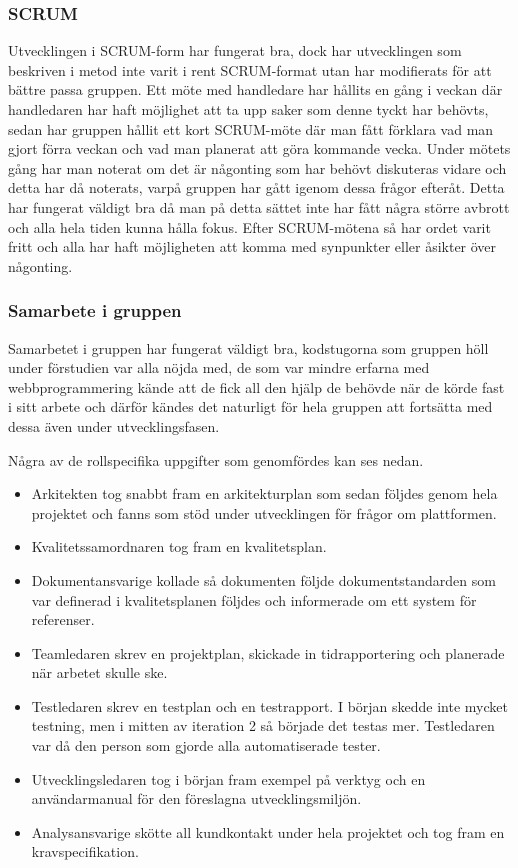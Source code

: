 \subsubsection{SCRUM}
Utvecklingen i SCRUM-form har fungerat bra,
dock har utvecklingen som beskriven i metod inte varit i rent SCRUM-format utan har modifierats för att bättre passa gruppen.
Ett möte med handledare har hållits en gång i veckan där handledaren har haft möjlighet att ta upp saker som denne tyckt har behövts,
sedan har gruppen hållit ett kort SCRUM-möte där man fått förklara vad man gjort förra veckan och vad man planerat
att göra kommande vecka. Under mötets gång har man noterat om det är någonting som har behövt diskuteras
vidare och detta har då noterats, varpå gruppen har gått igenom dessa frågor efteråt. Detta har fungerat väldigt bra då man på detta sättet inte har fått några större avbrott och alla hela tiden kunna hålla fokus. Efter SCRUM-mötena så har ordet varit fritt och alla har haft möjligheten att komma med synpunkter eller åsikter över någonting.

\subsubsection{Samarbete i gruppen}
Samarbetet i gruppen har fungerat väldigt bra, kodstugorna som gruppen höll under förstudien var alla nöjda med, de som var mindre erfarna med webbprogrammering kände att de fick all den hjälp de behövde när de körde fast i sitt arbete och därför kändes det naturligt för hela gruppen att fortsätta med dessa även under utvecklingsfasen. 

Några av de rollspecifika uppgifter som genomfördes kan ses nedan.
\begin{itemize}
\item Arkitekten tog snabbt fram en arkitekturplan som sedan följdes genom hela projektet och fanns som stöd under utvecklingen för frågor om plattformen.
\item Kvalitetssamordnaren tog fram en kvalitetsplan.
\item Dokumentansvarige kollade så dokumenten följde dokumentstandarden som var definerad i kvalitetsplanen följdes och informerade om ett system för referenser.
\item Teamledaren skrev en projektplan, skickade in tidrapportering och planerade när arbetet skulle ske.
\item Testledaren skrev en testplan och en testrapport. I början skedde inte mycket testning, men i mitten av iteration 2 så började det testas mer. Testledaren var då den person som gjorde alla automatiserade tester.
\item Utvecklingsledaren tog i början fram exempel på verktyg och en användarmanual för den föreslagna utvecklingsmiljön.  
\item Analysansvarige skötte all kundkontakt under hela projektet och tog fram en kravspecifikation. 
\end{itemize}   

